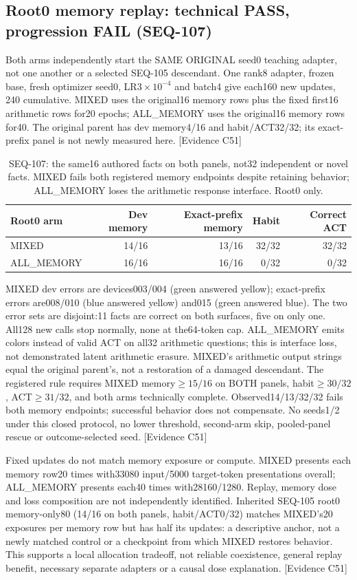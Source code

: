 \documentclass[11pt]{article}
\newcommand{\ev}[1]{\textsf{[Evidence #1]}}
\begin{document}
\subsection{Root0 memory replay: technical PASS, progression FAIL (SEQ-107)}
Both arms independently start the SAME ORIGINAL seed0 teaching adapter, not
one another or a selected SEQ-105 descendant. One rank8 adapter, frozen base,
fresh optimizer seed0, LR$3\times10^{-4}$ and batch4 give each160 new updates,
240 cumulative. MIXED uses the original16 memory rows plus the fixed first16
arithmetic rows for20 epochs; ALL\_MEMORY uses the original16 memory rows for40.
The original parent has dev memory4/16 and habit/ACT32/32; its exact-prefix
panel is not newly measured here. \ev{C51}

\begin{table}[ht]
\centering\small
\begin{tabular}{lrrrr}
\toprule
Root0 arm & Dev memory & Exact-prefix memory & Habit & Correct ACT \\
\midrule
MIXED & 14/16 & 13/16 & 32/32 & 32/32 \\
ALL\_MEMORY & 16/16 & 16/16 & 0/32 & 0/32 \\
\bottomrule
\end{tabular}
\caption{SEQ-107: the same16 authored facts on both panels, not32 independent
or novel facts. MIXED fails both registered memory endpoints despite retaining
behavior; ALL\_MEMORY loses the arithmetic response interface. Root0 only.}
\label{tab:seq107-replay}
\end{table}

MIXED dev errors are devices003/004 (green answered yellow); exact-prefix
errors are008/010 (blue answered yellow) and015 (green answered blue).
The two error sets are disjoint:11 facts are correct on both surfaces, five
on only one. All128 new calls stop normally, none at the64-token cap.
ALL\_MEMORY emits colors instead of valid ACT on all32 arithmetic questions;
this is interface loss, not demonstrated latent arithmetic erasure. MIXED's
arithmetic output strings equal the original parent's, not a restoration of
a damaged descendant. The registered rule requires MIXED memory$\geq15/16$
on BOTH panels, habit$\geq30/32$, ACT$\geq31/32$, and both arms technically
complete. Observed14/13/32/32 fails both memory endpoints; successful behavior
does not compensate. No seeds1/2 under this closed protocol, no lower threshold,
second-arm skip, pooled-panel rescue or outcome-selected seed. \ev{C51}

Fixed updates do not match memory exposure or compute. MIXED presents each
memory row20 times with33080 input/5000 target-token presentations overall;
ALL\_MEMORY presents each40 times with28160/1280. Replay, memory dose and loss
composition are not independently identified. Inherited SEQ-105 root0
memory-only80 (14/16 on both panels, habit/ACT0/32) matches MIXED's20 exposures
per memory row but has half its updates: a descriptive anchor, not a newly
matched control or a checkpoint from which MIXED restores behavior. This
supports a local allocation tradeoff, not reliable coexistence, general replay
benefit, necessary separate adapters or a causal dose explanation. \ev{C51}
\end{document}
